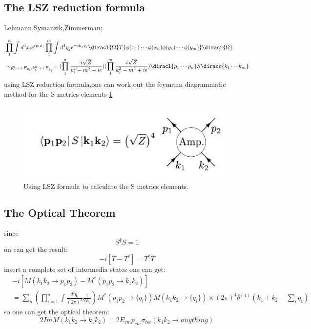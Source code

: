 \subsection{The LSZ reduction formula}
Lehmann,Symanzik,Zimmerman;\par
\begin{align*}
&\prod_1^n\int d^4x_ie^{ip_ix_i}\prod_1^m\int d^4y_je^{-ik_jy_j}\diracl{\Omega}T\{\phi(x_1)\cdots\phi(x_n)\phi(y_1)\cdots\phi(y_m)\}\diracr{\Omega}\\
&\sim_{p_i^0\rightarrow +E_{\vec{p}_i},k_j^0\rightarrow +E_{\vec{k}_j}}=(\prod_1^n\frac{i\sqrt{Z}}{p_i^2-m^2+i\epsilon})(\prod_1^m\frac{i\sqrt{Z}}{k_j^2-m^2+i\epsilon})\diracl{p_1\cdots p_n}S\diracr{k_1\cdots k_m}
\end{align*}
using LSZ reduction formula,one can work out the feymann diagrammatic method for the  S metrics elements \ref{fig:amputa}
\begin{figure}
\begin{center}
\includegraphics[height=4cm]{./figures/AmputatedFey}
\caption{Using LSZ formula to calculate the S metrics elements.}
\label{fig:amputa}
\end{center}
\end{figure}
\subsection{The Optical Theorem}
since 
\[S^{\dagger}S=1\]
on can get the result:
\[-i[T-T^{\dagger}]=T^{\dagger}T\]
insert a complete set of intermedia states one can get:
\begin{align*}
&-i[M(k_1k_2\rightarrow p_1p_2)-M^*(p_1p_2\rightarrow k_1k_2)]
\\
&=\sum_n(\prod_{i=1}^n\int \frac{d^3q_i}{(2\pi)^3}\frac{1}{2E_i})M^*(p_1p_2\rightarrow \{q_i\})M(k_1k_2\rightarrow\{q_i\})\times(2\pi)^4\delta^{(4)}(k_1+k_2-\sum_iq_i)
\end{align*}
so one can get the optical theorem:
\[2Im M(k_1k_2\rightarrow k_1k_2)=2E_{cm}p_{cm}\sigma_{tot}(k_1k_2\rightarrow anything)\]
